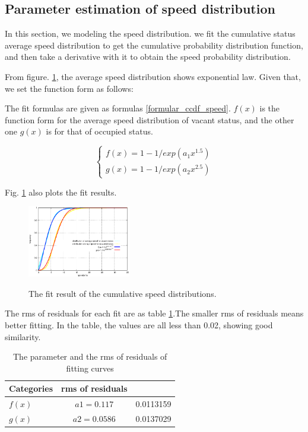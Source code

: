 \subsection{Parameter estimation of speed distribution}
\label{section_speed_modeling}
In this section, we modeling the speed distribution. we fit the cumulative status average speed distribution to get the cumulative probability distribution function, and then take a derivative with it to obtain the speed probability distribution.

From figure. \ref{figure_fit_ccdf_speed}, the average speed distribution shows exponential law. Given that, we set the function form as follows:

The fit formulas are given as formulas \ref{formular_ccdf_speed}. $f(x)$ is the function form for the average speed distribution of vacant status, and the other one $g(x)$ is for that of occupied status.

\begin{equation}\label{formular_ccdf_speed}
\left\{
\begin{array}{ll}
f(x) = 1-1/exp(a_1x^{1.5})\\
g(x) = 1-1/exp(a_2x^{2.5})
\end{array}
\right.
\end{equation}


Fig. \ref{figure_fit_ccdf_speed} also plots the fit results. 

\begin{figure}
\centering
\includegraphics[width=0.4\textwidth]{figures_201103/fit/speedfit.eps}\\
\centering
\caption{The fit result of the cumulative speed distributions.}\label{figure_fit_ccdf_speed}
\end{figure}

The rms of residuals for each fit are as table \ref{table_rms}.The smaller rms of residuals means better fitting. In the table, the values are all less than 0.02, showing good similarity.

\begin{table}
\caption{The parameter and the rms of residuals of fitting curves}\label{table_rms}
\centering
\begin{tabular}{l|c|c}
  \hline
  Categories & rms of residuals  \\
  \hline
  $f(x)$ &$a1=0.117$ &0.0113159\\
  $g(x)$ &$a2=0.0586$ &0.0137029\\
  \hline
\end{tabular}
\end{table}

